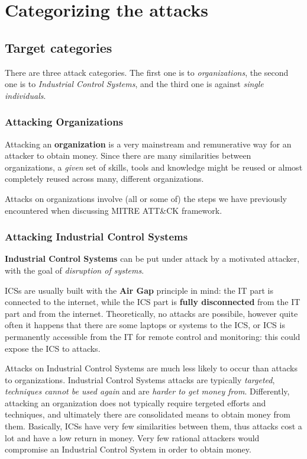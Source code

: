 \documentclass[10pt]{extreport}
\begin{document}
\chapter{Categorizing the attacks}


\section{Target categories}

There are three attack categories. The first one is to \emph{organizations},
the second one is to \emph{Industrial Control Systems}, and the third one
is against \emph{single individuals}.

\subsection{Attacking Organizations}

Attacking an \textbf{organization} is a very mainstream and remunerative way
for an attacker to obtain money. Since there are many similarities between
organizations, a \emph{given} set of skills, tools and knowledge might be
reused or almost completely reused across many, different organizations.

Attacks on organizations involve (all or some of) the steps we have previously
encountered when discussing MITRE ATT\&CK framework.

\subsection{Attacking Industrial Control Systems}

\textbf{Industrial Control Systems} can be put under attack by a motivated
attacker, with the goal of \emph{disruption of systems}.

ICSs are usually built with the \textbf{Air Gap} principle in mind: the IT part
is connected to the internet, while the ICS part is \textbf{fully disconnected}
from the IT part and from the internet. Theoretically, no attacks are
possibile, however quite often it happens that there are some laptops or
systems to the ICS, or ICS is permanently accessible from the IT for remote
control and monitoring: this could expose the ICS to attacks.

Attacks on Industrial Control Systems are much less likely to occur than
attacks to organizations. Industrial Control Systems attacks are typically
\emph{targeted}, \emph{techniques cannot be used again} and are \emph{harder to
get money from}. Differently, attacking an organization does not typically
require tergeted efforts and techniques, and ultimately there are consolidated
means to obtain money from them. Basically, ICSs have very few similarities
between them, thus attacks cost a lot and have a low return in money. Very few
rational attackers would compromise an Industrial Control System in order to
obtain money.
\end{document}
